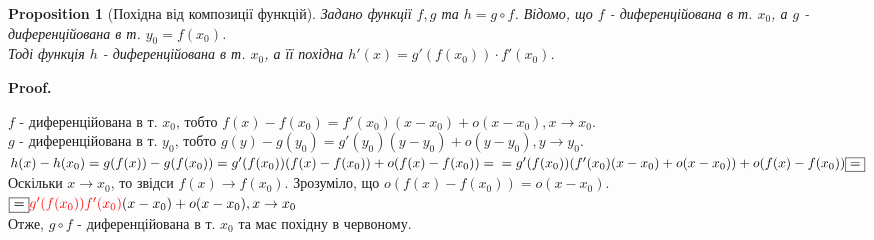 \documentclass[a4paper, 14pt]{article}
\makeatletter
\def\qed{$\blacksquare$}
\theoremstyle{theoremdd}
\theoremstyle{theoremdd}
\theoremstyle{theoremdd}
\theoremstyle{theoremdd}
\theoremstyle{theoremdd}
\newtheorem{proposition}[theorem]{Proposition}
\theoremstyle{theoremdd}
\theoremstyle{theoremdd}
\theoremstyle{theoremdd}
\renewenvironment{proof}[1][Proof.\\]{\par
\pushQED{\hfill \qed}%
\normalfont \topsep6\p@\@plus6\p@\relax
\trivlist
\item\relax
{\bfseries
#1\@addpunct{.}}\hspace\labelsep\ignorespaces
}{%
\popQED\endtrivlist\@endpefalse
}
\makeatother
\begin{document}
\iffalse
\begin{proof}
Альтернативне доведення буде проводитись за допомогою минуло доведеного твердження:\\
1) $(cf)'(x_0) = \displaystyle \lim_{x \to x_0} \frac{cf(x)-cf(x_0)}{x-x_0} = c f'(x_0) \\ \Rightarrow cf$ - диференційована в т. $x_0$.
\bigskip \\
2) $(f+g)'(x_0) = \displaystyle \lim_{x \to x_0} \frac{f(x)+g(x) - f(x_0)-g(x_0)}{x-x_0} = \lim_{x \to x_0} \frac{f(x) - f(x_0)}{x-x_0} + \lim_{x \to x_0} \frac{g(x) - g(x_0)}{x-x_0} = \\ = f'(x_0) + g'(x_0) \\ \Rightarrow f+g$ - диференційована в т. $x_0$.
\bigskip \\
3) $(f \cdot g)'(x_0) = \displaystyle \lim_{x \to x_0} \frac{f(x)g(x) - f(x_0)g(x_0)}{x-x_0} = \lim_{x \to x_0} \frac{f(x)g(x) - f(x_0)g(x) + f(x_0)g(x) - f(x_0)g(x_0)}{x-x_0} = \\ = \lim_{x \to x_0} g(x) \frac{f(x)-f(x_0)}{x-x_0} + f(x_0) \lim_{x \to x_0} \frac{g(x)-g(x_0)}{x-x_0} = f'(x_0)g(x_0) + f(x_0)g'(x_0) \\ \Rightarrow fg$ - диференційована в т. $x_0$.
\bigskip \\
4) $\displaystyle \left(\frac{f}{g}\right)'(x_0) = \lim_{x \to x_0} \frac{\textstyle \frac{f(x)}{g(x)} - \frac{f(x_0)}{g(x_0)}}{x-x_0} = \lim_{x \to x_0} \frac{f(x)g(x_0)-f(x_0)g(x)}{g(x)g(x_0)(x-x_0)} \overset{\textrm{як в 3)}}{=} \frac{1}{(g(x_0))^2} (f'(x_0)g(x_0) - f(x_0)g'(x_0)) \\ \Rightarrow \frac{f}{g}$ - диференційована в т. $x_0$.
\end{proof}
\fi

\begin{proposition}[Похідна від композиції функцій]
Задано функції $f,g$ та $h=g \circ f$. Відомо, що $f$ - диференційована в т. $x_0$, а $g$ - диференційована в т. $y_0 = f(x_0)$.\\
Тоді функція $h$ - диференційована в т. $x_0$, а її похідна $h'(x) = g'(f(x_0)) \cdot f'(x_0)$.
\end{proposition}

\begin{proof}
$f$ - диференційована в т. $x_0$, тобто $f(x)-f(x_0)=f'(x_0)(x-x_0)+o(x-x_0), x \to x_0$.\\
$g$ - диференційована в т. $y_0$, тобто $g(y)-g(y_0)=g'(y_0)(y-y_0)+o(y-y_0), y \to y_0$.\\
$h(x)-h(x_0) = g(f(x))-g(f(x_0)) = g'(f(x_0))(f(x)-f(x_0))+o(f(x)-f(x_0)) = \\
= g'(f(x_0))(f'(x_0)(x-x_0) + o(x-x_0)) + o(f(x)-f(x_0)) \boxed{=}$\\
Оскільки $x \to x_0$, то звідси $f(x) \to f(x_0)$. Зрозуміло, що $o(f(x)-f(x_0)) = o(x-x_0)$.\\
$\boxed{=} \textcolor{red}{g'(f(x_0))f'(x_0)}(x-x_0) + o(x-x_0), x \to x_0$\\
Отже, $g \circ f$ - диференційована в т. $x_0$ та має похідну в червоному.
\end{proof}
\end{document}
